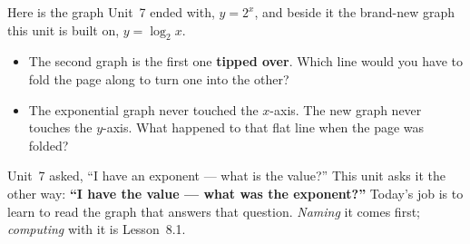 \documentclass[10pt]{article}
\newcommand{\lgrid}[4]{%
  \draw[step=1, linegray!40, very thin] (#1,#3) grid (#2,#4);
  \draw[->, semithick, charcoal] (#1,0)--(#2,0) node[below right, font=\scriptsize]{$x$};
  \draw[->, semithick, charcoal] (0,#3)--(0,#4) node[left, font=\scriptsize]{$y$};}
\newcommand{\logcurve}[5]{\draw[very thick, forest, domain=#4:#5, samples=120, smooth]
  plot ({pow(#1,\x-(#3))+(#2)},{\x});}
\begin{document}
\begin{hookbox}
Here is the graph Unit~7 ended with, $y=2^x$, and beside it the brand-new graph this unit is built
on, $y=\log_2 x$.
\begin{center}
\end{center}
\begin{itemize}\setlength{\itemsep}{1pt}
  \item The second graph is the first one \textbf{tipped over}. Which line would you have to fold the page along to turn one into the other? \writeline
  \item The exponential graph never touched the $x$-axis. The new graph never touches the $y$-axis. What happened to that flat line when the page was folded? \writeline
\end{itemize}
Unit~7 asked, ``I have an exponent --- what is the value?'' This unit asks it the other way:
\textbf{``I have the value --- what was the exponent?''} Today's job is to learn to read the graph
that answers that question. \emph{Naming} it comes first; \emph{computing} with it is Lesson~8.1.
\end{hookbox}
\end{document}
